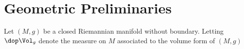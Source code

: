 \section{Geometric Preliminaries}
Let $(M,g)$ be a closed Riemannian manifold without boundary. Letting $\dop \Vol_g$ denote the measure on $M$ associated to the volume form of $(M,g)$